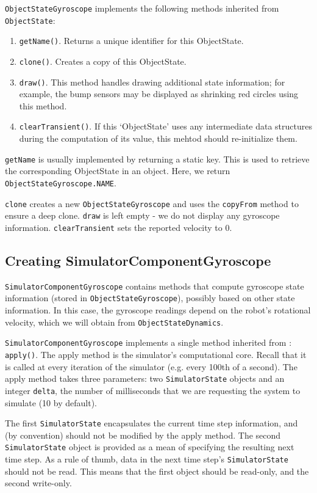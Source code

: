\documentclass[12pt]{article}
\newcommand{\code}[1]{\texttt{#1}}
\begin{document}
\code{ObjectStateGyroscope} implements the following methods inherited from 
\code{ObjectState}:

\begin{enumerate}
  \item{\code{getName()}. Returns a unique identifier for this ObjectState.}
  \item{\code{clone()}. Creates a copy of this ObjectState.}
  \item{\code{draw()}. This method handles drawing additional state information;
    for example, the bump sensors may be displayed as shrinking red circles
    using this method.}
  \item{\code{clearTransient()}. If this `ObjectState' uses any intermediate
    data structures during the computation of its value, this mehtod should 
    re-initialize them.}
\end{enumerate}

\code{getName} is usually implemented by returning a static key. This is used
to retrieve the corresponding ObjectState in an object.  Here, we return
\code{ObjectStateGyroscope.NAME}.

\code{clone} creates a new \code{ObjectStateGyroscope} and uses the
\code{copyFrom} method to ensure a deep clone.
\code{draw} is left empty - we do not display any gyroscope information.
\code{clearTransient} sets the reported velocity to 0.


\subsection{Creating SimulatorComponentGyroscope}

\code{SimulatorComponentGyroscope} contains methods that compute gyroscope
state information (stored in \code{ObjectStateGyroscope}), possibly based
on other state information. In this case, the gyroscope readings depend on
the robot's rotational velocity, which we will obtain from 
\code{ObjectStateDynamics}.

\code{SimulatorComponentGyroscope} implements a single method inherited from
: \code{apply()}. The apply method is the simulator's
computational core. Recall that it is called at every iteration of the 
simulator (e.g. every 100th of a second). The apply method takes three 
parameters: two \code{SimulatorState} objects and an integer \code{delta},
the number of milliseconds that we are requesting the system to simulate
(10 by default).

The first \code{SimulatorState} encapsulates the current time step information,
and (by convention) should not be modified by the apply method. The second
\code{SimulatorState} object is provided as a mean of specifying the resulting
next time step. As a rule of thumb, data in the next time step's 
\code{SimulatorState} should not be read. This means that the first object
should be read-only, and the second write-only. 
\end{document}
